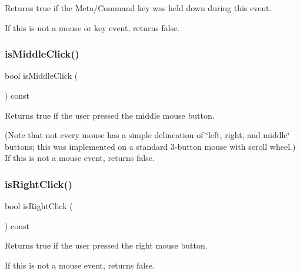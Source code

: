 Returns {\ttfamily true} if the Meta/\+Command key was held down during this event. 

If this is not a mouse or key event, returns false. \mbox{\label{classsgl_1_1GEvent_a92daecef1639c08c9565df591d261026}} 
\subsubsection{\texorpdfstring{is\+Middle\+Click()}{isMiddleClick()}}
{\footnotesize\ttfamily bool is\+Middle\+Click (\begin{DoxyParamCaption}{ }\end{DoxyParamCaption}) const\hspace{0.3cm}{\ttfamily [virtual]}}



Returns true if the user pressed the middle mouse button. 

(Note that not every mouse has a simple delineation of \char`\"{}left, right,
and middle\char`\"{} buttons; this was implemented on a standard 3-\/button mouse with scroll wheel.) If this is not a mouse event, returns false. \mbox{\label{classsgl_1_1GEvent_abf4c07eef83e15984a352af91c927d3d}} 
\subsubsection{\texorpdfstring{is\+Right\+Click()}{isRightClick()}}
{\footnotesize\ttfamily bool is\+Right\+Click (\begin{DoxyParamCaption}{ }\end{DoxyParamCaption}) const\hspace{0.3cm}{\ttfamily [virtual]}}



Returns true if the user pressed the right mouse button. 

If this is not a mouse event, returns false. \mbox{\label{classsgl_1_1GEvent_a814434d4ee5d0792e2c9ffdf8433766c}} 
